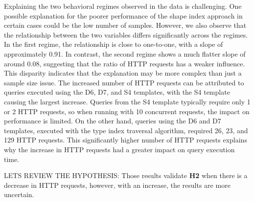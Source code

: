 Explaining the two behavioral regimes observed in the data is challenging.
One possible explanation for the poorer performance of the shape index approach in certain cases could be the low number of samples.
However, we also observe that the relationship between the two variables differs significantly across the regimes.
In the first regime, the relationship is close to one-to-one, with a slope of approximately 0.91.
In contrast, the second regime shows a much flatter slope of around 0.08, suggesting that the ratio of HTTP requests has a weaker influence.
This disparity indicates that the explanation may be more complex than just a sample size issue.
The increased number of HTTP requests can be attributed to queries executed using the D6, D7, and S4 templates, with the S4 template causing the largest increase.
Queries from the S4 template typically require only 1 or 2 HTTP requests, so when running with 10 concurrent requests, the impact on performance is limited.
On the other hand, queries using the D6 and D7 templates, executed with the type index traversal algorithm, required 26, 23, and 129 HTTP requests.
This significantly higher number of HTTP requests explains why the increase in HTTP requests had a greater impact on query execution time.

LETS REVIEW THE HYPOTHESIS: Those results validate \textbf{H2} when there is a decrease in HTTP requests, however, with an increase, the results are more uncertain.
